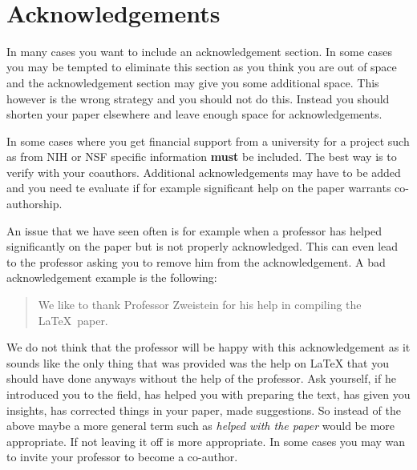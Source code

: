 \FILENAME\

\section{Acknowledgements}
\label{S:acknowledgements}

In many cases you want to include an acknowledgement section. In some
cases you may be tempted to eliminate this section as you think you
are out of space and the acknowledgement section may give you some
additional space. This however is the wrong strategy and you should
not do this. Instead you should shorten your paper elsewhere and leave
enough space for acknowledgements.

In some cases where you get financial support from a university for a
project such as from NIH or NSF specific information {\bf must} be
included. The best way is to verify with your coauthors. Additional
acknowledgements may have to be added and you need te evaluate if for
example significant help on the paper warrants co-authorship.

An issue that we have seen often is for example when a professor has
helped significantly on the paper but is not properly acknowledged.
This can even lead to the professor asking you to remove him from the
acknowledgement. A bad acknowledgement example is the following:

\begin{quote} 

  We like to thank Professor Zweistein for his help in
  compiling the \LaTeX~paper. 

\end{quote}

We do not think that the professor will be happy with this
acknowledgement as it sounds like the only thing that was provided was
the help on LaTeX that you should have done anyways without the help
of the professor. Ask yourself, if he introduced you to the field, has
helped you with preparing the text, has given you insights, has
corrected things in your paper, made suggestions. So instead of the
above maybe a more general term such as \textit{helped with the paper}
would be more appropriate. If not leaving it off is more appropriate.
In some cases you may wan to invite your professor to become a
co-author.
